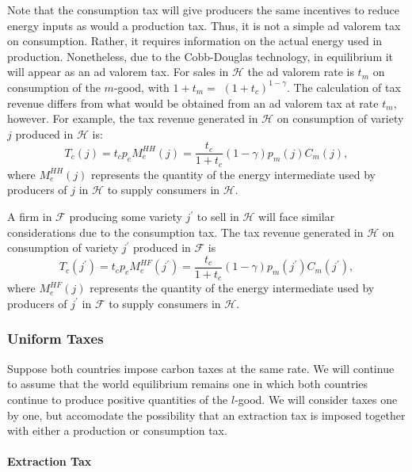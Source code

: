 \documentclass[notitlepage,12pt]{article}
\begin{document}
Note that the consumption tax will give producers the same incentives to
reduce energy inputs as would a production tax. Thus, it is not a simple ad
valorem tax on consumption. Rather, it requires information on the actual
energy used in production. Nonetheless, due to the Cobb-Douglas technology,
in equilibrium it will appear as an ad valorem tax. For sales in $\mathcal{H}
$ the ad valorem rate is $t_{m}$ on consumption of the $m$-good, with $%
1+t_{m}=$ $\left( 1+t_{c}\right) ^{1-\gamma }$. The calculation of tax
revenue differs from what would be obtained from an ad valorem tax at rate $%
t_{m}$, however. For example, the tax revenue generated in $\mathcal{H}$ on
consumption of variety $j$ produced in $\mathcal{H}$ is:%
\begin{equation*}
T_{c}(j)=t_{c}p_{e}M_{e}^{HH}(j)=\frac{t_{c}}{1+t_{c}}\left( 1-\gamma
\right) p_{m}(j)C_{m}(j),
\end{equation*}%
where $M_{e}^{HH}(j)$ represents the quantity of the energy intermediate
used by producers of $j$ in $\mathcal{H}$ to supply consumers in $\mathcal{H}
$.

A firm in $\mathcal{F}$ producing some variety $j^{\prime }$ to sell in $%
\mathcal{H}$ will face similar considerations due to the consumption tax.
The tax revenue generated in $\mathcal{H}$ on consumption of variety $%
j^{\prime }$ produced in $\mathcal{F}$ is%
\begin{equation*}
T_{c}(j^{\prime })=t_{c}p_{e}M_{e}^{HF}(j^{\prime })=\frac{t_{c}}{1+t_{c}}%
\left( 1-\gamma \right) p_{m}(j^{\prime })C_{m}(j^{\prime }),
\end{equation*}%
where $M_{e}^{HF}(j)$ represents the quantity of the energy intermediate
used by producers of $j^{\prime }$ in $\mathcal{F}$ to supply consumers in $%
\mathcal{H}$.

\subsubsection{Uniform Taxes}

Suppose both countries impose carbon taxes at the same rate. We will
continue to assume that the world equilibrium remains one in which both
countries continue to produce positive quantities of the $l$-good. We will
consider taxes one by one, but accomodate the possibility that an extraction
tax is imposed together with either a production or consumption tax.

\paragraph{Extraction Tax}
\end{document}

